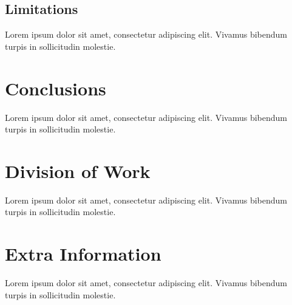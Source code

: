 \documentclass[11pt, a4paper]{article}
\begin{document}
\subsection{Limitations}
Lorem ipsum dolor sit amet, consectetur adipiscing elit. Vivamus bibendum turpis in sollicitudin
molestie.

\section{Conclusions}
Lorem ipsum dolor sit amet, consectetur adipiscing elit. Vivamus bibendum turpis in sollicitudin
molestie.

\section{Division of Work}
Lorem ipsum dolor sit amet, consectetur adipiscing elit. Vivamus bibendum turpis in sollicitudin
molestie.

\section{Extra Information}
Lorem ipsum dolor sit amet, consectetur adipiscing elit. Vivamus bibendum turpis in sollicitudin
molestie.
\end{document}
